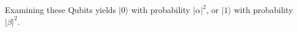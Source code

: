 \documentclass[preview]{standalone}
\begin{document}
\begin{center}
Examining these Qubits yields $ | 0 \rangle $ with probability $ | \alpha |^2 $, or $ |1 \rangle$ with probability $|\beta|^2$.
\end{center}
\end{document}
